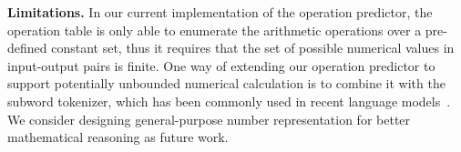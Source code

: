 \textbf{Limitations.} In our current implementation of the operation predictor, the operation table is only able to enumerate the arithmetic operations over a pre-defined constant set, thus it requires that the set of possible numerical values in input-output pairs is finite. One way of extending our operation predictor to support potentially unbounded numerical calculation is to combine it with the subword tokenizer, which has been commonly used in recent language models~\cite{devlin2018bert,chen2021evaluating,austin2021program}. We consider designing general-purpose number representation for better mathematical reasoning as future work.




